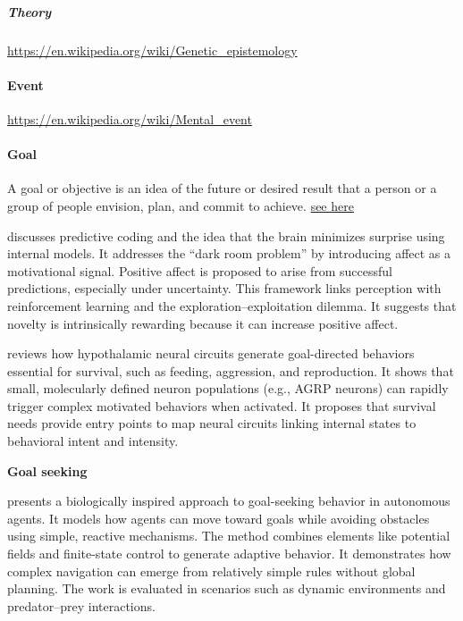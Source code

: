 \documentclass{book}
\newcommand{\seehere}[1]{\href{#1}{see here}}
\providecommand{\ProjectDeepHeading}[2]{%
    \par\medskip\noindent\textbf{#2}\par\smallskip
}
\providecommand{\seehere}[1]{\href{#1}{see here}}
\begin{document}
\subparagraph{Theory}


\url{https://en.wikipedia.org/wiki/Genetic_epistemology}

\paragraph{Event}


\url{https://en.wikipedia.org/wiki/Mental_event}

\paragraph{Goal}


A goal or objective is an idea of the future or desired result that a person or a group of people envision, plan, and commit to achieve. \seehere{https://en.wikipedia.org/wiki/Goal}
    
    \cite{trapp-2017-commentary-on-the-joys-of-perceiving-affect-as-feedback-for-perceptual-predictions} discusses predictive coding and the idea that the brain minimizes surprise using internal models. It addresses the “dark room problem” by introducing affect as a motivational signal. Positive affect is proposed to arise from successful predictions, especially under uncertainty. This framework links perception with reinforcement learning and the exploration–exploitation dilemma. It suggests that novelty is intrinsically rewarding because it can increase positive affect.
    
    \cite{sternson-2013-hypothalamic-survival-circuits-blueprints-for-purposive-behaviors} reviews how hypothalamic neural circuits generate goal-directed behaviors essential for survival, such as feeding, aggression, and reproduction.
    It shows that small, molecularly defined neuron populations (e.g., AGRP neurons) can rapidly trigger complex motivated behaviors when activated.
    It proposes that survival needs provide entry points to map neural circuits linking internal states to behavioral intent and intensity.
    
    
    \ProjectDeepHeading{2}{Goal seeking}
        \cite{kerr-2017-biological-goal-seeking} presents a biologically inspired approach to goal-seeking behavior in autonomous agents. It models how agents can move toward goals while avoiding obstacles using simple, reactive mechanisms. The method combines elements like potential fields and finite-state control to generate adaptive behavior.
        It demonstrates how complex navigation can emerge from relatively simple rules without global planning. The work is evaluated in scenarios such as dynamic environments and predator–prey interactions.
        
\end{document}
